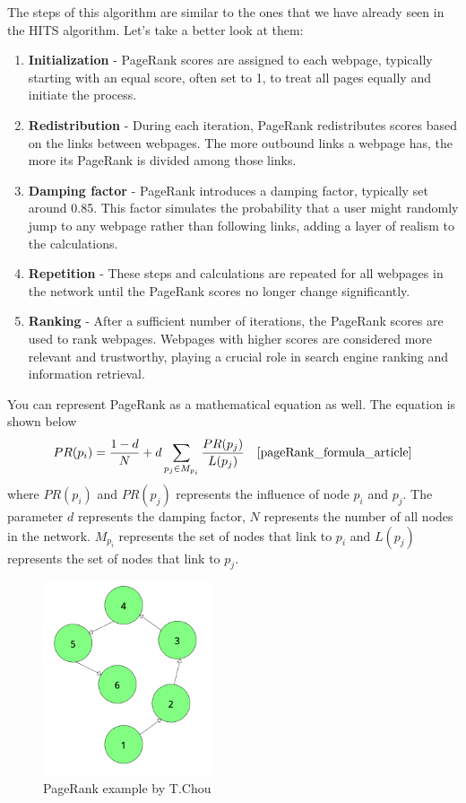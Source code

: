 \documentclass[10pt,english,a4paper]{article}
\begin{document}
The steps of this algorithm are similar to the ones that we have already seen in the HITS algorithm. Let's take a better look at them:
\begin{enumerate}
  \item \textbf{Initialization} - PageRank scores are assigned to each webpage, typically starting with an equal score, often set to 1, to treat all pages equally and initiate the process.
  \item \textbf{Redistribution} - During each iteration, PageRank redistributes scores based on the links between webpages. The more outbound links a webpage has, the more its PageRank is divided among those links.
  \item \textbf{Damping factor} - PageRank introduces a damping factor, typically set around 0.85. This factor simulates the probability that a user might randomly jump to any webpage rather than following links, adding a layer of realism to the calculations.
  \item \textbf{Repetition} - These steps and calculations are repeated for all webpages in the network until the PageRank scores no longer change significantly.
  \item \textbf{Ranking} -  After a sufficient number of iterations, the PageRank scores are used to rank webpages. Webpages with higher scores are considered more relevant and trustworthy, playing a crucial role in search engine ranking and information retrieval.
\end{enumerate}
You can represent PageRank as a mathematical equation as well. The equation is shown below
\[
PR(p_i) = \frac{1 - d}{N} + d \sum_{p_j \in M_{p_i}} \frac{PR(p_j)}{L(p_j)} \quad {\cite{pageRank_formula_article}}
\]
where $PR(p_i)$ and $PR(p_j)$ represents the influence of node $p_i$ and $p_j$. The parameter $d$ represents the damping factor, $N$ represents the number of all nodes in the network. $M_{p_i}$ represents the set of nodes that link to $p_i$ and $L(p_j)$ represents the set of nodes that link to $p_j$. 
\begin{figure}[h]
  \centering
  \includegraphics[width=0.45\textwidth]{explanation_PageRank.png}
  \caption{PageRank example by T.Chou\cite{pageRank_article}}
  \label{explanation_PageRank}
\end{figure}
\end{document}
